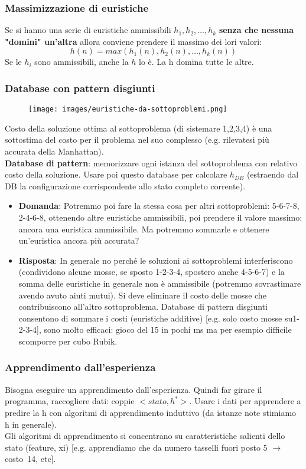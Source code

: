 \subsubsection{Massimizzazione di euristiche}
Se si hanno una serie di euristiche ammissibili $h_1, h_2, \dots, h_k$ \textbf{senza che nessuna "domini" un'altra}
allora conviene prendere il massimo dei lori valori:
$$h(n) = max(h_1(n), h_2(n), \dots, h_k(n))$$
Se le $h_i$ sono ammissibili, anche la $h$ lo è. La h domina tutte le altre.

\subsubsection{Database con pattern disgiunti}
\begin{figure}[h!]
    \centering
    \texttt{[image: images/euristiche-da-sottoproblemi.png]}
\end{figure}
\hspace{-15pt}Costo della soluzione ottima al sottoproblema (di sistemare 1,2,3,4) è una sottostima del costo per il problema nel suo
complesso (e.g. rilevatesi più accurata della Manhattan). \\
\textbf{Database di pattern}: memorizzare ogni istanza del
sottoproblema con relativo costo della soluzione. Usare poi questo database per calcolare $h_{DB}$ (estraendo dal DB la
configurazione corrispondente allo stato completo corrente).
\begin{itemize}
    \item \textbf{Domanda}: Potremmo poi fare la stessa cosa per altri sottoproblemi: 5-6-7-8, 2-4-6-8, ottenendo altre euristiche ammissibili,
    poi prendere il valore massimo: ancora una euristica ammissibile. Ma potremmo sommarle e ottenere un’euristica
    ancora più accurata?
    \item \textbf{Risposta}: In generale no perché le soluzioni ai sottoproblemi interferiscono (condividono alcune mosse, se sposto 1-2-3-4, spostero
    anche 4-5-6-7) e la somma delle euristiche in generale non è ammissibile (potremmo sovrastimare avendo avuto aiuti mutui).
    Si deve eliminare il costo delle mosse che contribuiscono all’altro sottoproblema. Database di pattern disgiunti consentono di sommare i
    costi (euristiche additive) [e.g. solo costo mosse su1-2-3-4], sono molto efficaci: gioco del 15 in pochi ms
    ma per esempio difficile scomporre per cubo Rubik.
\end{itemize}

\subsubsection{Apprendimento dall'esperienza}
Bisogna eseguire un apprendimento dall'esperienza. Quindi far girare il programma, raccogliere dati: coppie
$<stato, h^*>$. Usare i dati per apprendere a predire la h con algoritmi di apprendimento induttivo (da istanze note stimiamo h in generale).\\
Gli algoritmi di apprendimento si concentrano su caratteristiche salienti dello stato (feature, xi) [e.g.
apprendiamo che da numero tasselli fuori posto 5 $\to$ costo~14, etc].


